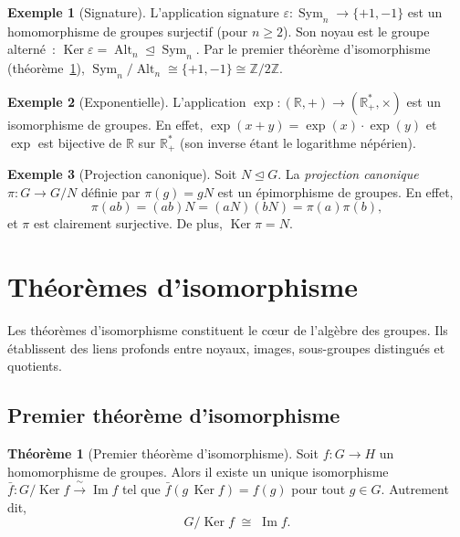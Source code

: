\documentclass[12pt,a4paper,openany]{book}
\theoremstyle{definition}
\newtheorem{theoreme}{Théorème}[chapter]
\newtheorem{exemple}{Exemple}[chapter]
\newcommand{\Z}{\mathbb{Z}}
\newcommand{\R}{\mathbb{R}}
\DeclareMathOperator{\Sym}{Sym}
\DeclareMathOperator{\Alt}{Alt}
\DeclareMathOperator{\Ker}{Ker}
\renewcommand{\Im}{\operatorname{Im}}
\begin{document}
\begin{exemple}[Signature]\label{ex:hom-sign}
  L'application signature $\varepsilon\colon\Sym_n\to\{+1,-1\}$
  est un homomorphisme de groupes surjectif (pour $n\geq 2$).
  Son noyau est le groupe alterné~:
  $\Ker\varepsilon = \Alt_n \trianglelefteq \Sym_n$.
  Par le premier théorème d'isomorphisme (théorème~\ref{thm:premier-iso}),
  $\Sym_n/\Alt_n\cong\{+1,-1\}\cong\Z/2\Z$.
\end{exemple}

\begin{exemple}[Exponentielle]\label{ex:hom-exp}
  L'application $\exp\colon(\R,+)\to(\R_+^*,\times)$
  est un isomorphisme de groupes. En effet,
  $\exp(x+y)=\exp(x)\cdot\exp(y)$ et $\exp$ est bijective de $\R$ sur
  $\R_+^*$ (son inverse étant le logarithme népérien).
\end{exemple}

\begin{exemple}[Projection canonique]\label{ex:hom-projection}
  Soit $N\trianglelefteq G$. La \emph{projection
  canonique}
  $\pi\colon G\to G/N$ définie par $\pi(g)=gN$ est un épimorphisme de
  groupes. En effet,
  \[
    \pi(ab) = (ab)N = (aN)(bN) = \pi(a)\pi(b),
  \]
  et $\pi$ est clairement surjective. De plus, $\Ker\pi = N$.
\end{exemple}

\section{Théorèmes d'isomorphisme}\label{sec:thm-iso}

Les théorèmes d'isomorphisme constituent le c\oe ur de l'algèbre des
groupes. Ils établissent des liens profonds entre noyaux, images,
sous-groupes distingués et quotients.

\subsection{Premier théorème d'isomorphisme}\label{subsec:premier-iso}

\begin{theoreme}[Premier théorème d'isomorphisme]\label{thm:premier-iso}
  Soit $f\colon G\to H$ un homomorphisme de groupes.
  Alors il existe un unique isomorphisme
  $\bar{f}\colon G/\Ker f \xrightarrow{\;\sim\;} \Im f$
  tel que $\bar{f}(g\,\Ker f) = f(g)$ pour tout $g\in G$.
  Autrement dit,
  \[
    G/\Ker f \;\cong\; \Im f.
  \]
\end{theoreme}
\end{document}
